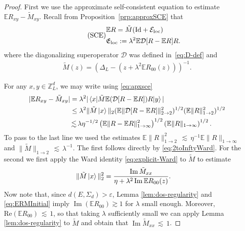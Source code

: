 \documentclass[11pt]{amsart}
\def\Z{{\mathbb{Z}}}
\def\Expec{{\mathbb E}}
\def\eps{{\varepsilon}}
\newcommand{\Id}{{\operatorname*{Id}}}
\newcommand{\Impt}{\operatorname*{Im}}
\def\lsim{{\,\lesssim\,}}
\def\ket#1{\mathinner{|{#1}\rangle}}
\def\braket#1{\mathinner{\langle{#1}\rangle}}
\newcommand{\mcal}[1]{{\mathcal{#1}}}
\numberwithin{equation}{section}
\numberwithin{theorem}{section}
\begin{document}
\begin{proof}
First we use the approximate self-consistent equation to estimate $\mathbb{E}R_{xy}-\tilde{M}_{xy}$. Recall from Proposition~\ref{prp:approxSCE} that
\begin{equation}\tag*{(SCE)}
\label{eq:apxsce}
\begin{split}
&\mathbb{E}R = \tilde{M}(\Id+\mcal{E}_{\rm loc}) \\
&\mathfrak{E}_{\rm loc} := \lambda^2\mathbb{E}\mathcal{D}[R-\Expec R]R.
\end{split}
\end{equation}
where the diagonalizing superoperator $\mcal{D}$ was defined in~\eqref{eq:D-def} and
\begin{align*}
\tilde{M}(z)=(\Delta_L-(z+\lambda^{2}\Expec R_{00}(z)))^{-1}.
\end{align*}

For any $x,y\in \Z^{d}_{L}$, we may write using \ref{eq:apxsce}
\begin{align*}
|\Expec R_{xy} - \tilde{M}_{xy}|
&= \lambda^2 |\braket{x|\tilde{M} \Expec (\mcal{D}[R-\Expec R])R|y}| \\
&\leq \lambda^2\|\tilde{M}\ket{x}\|_{2}(\Expec \|\mcal{D}[R-\Expec R]\|_{2\to 2}^2)^{1/2}
(\Expec \|R\|_{1\to 2}^2)^{1/2} \\
&\lsim \lambda\eta^{-1 / 2} \left(  \Expec \|R-\Expec R\|_{1\to \infty}^{2}\right) ^{1/ 2}
\left( \Expec\|R\|_{1\to \infty} \right)^{1 /2}.
\end{align*}
To pass to the last line we used the estimates $\mathbb{E}\|R\|_{1\to 2}^2\lsim \eta^{-1}\mathbb{E}\|R\|_{1\to\infty}$
and $\|\tilde{M}\|_{1\to 2}\lsim \lambda^{-1}$. The first follows directly by
\eqref{eq:2toInftyWard}. For the second we first apply the Ward identity \eqref{eq:explicit-Ward}
to $\tilde{M}$ to estimate
\begin{align*}
\|\tilde{M}\ket{x}\|_{2}^2
& = \frac{\Impt \tilde{M}_{xx}}{\eta + \lambda^2\Impt\mathbb{E}R_{00}(z)}.
\end{align*}
Now note that, since $d(E,\Sigma_d)>\eps$,  Lemma \ref{lem:dos-regularity} and \eqref{eq:ERMInitial} imply $\Impt(\mathbb{E}R_{00})\gtrsim 1$ for $\lambda$
small enough.  Moreover, $\text{Re}(\mathbb{E}R_{00})\lsim 1$, so that
taking $\lambda$ sufficiently small we can apply Lemma \ref{lem:dos-regularity} to $\tilde{M}$ and obtain that $\Impt{\tilde{M}_{xx}}\lsim 1$.



\end{proof}
\end{document}
